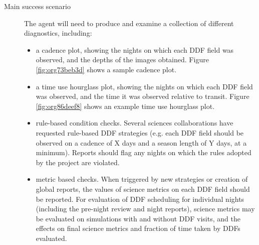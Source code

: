 \begin{description}
\item[{Main success scenario}] The agent will need to produce and examine a collection of different diagnostics, including:
\begin{itemize}
\item a cadence plot, showing the nights on which each DDF field was observed, and the depths of the images obtained. Figure \ref{fig:org73beb3d} shows a sample cadence plot.
\item a time use hourglass plot, showing the nights on which each DDF field was observed, and the time it was observed relative to transit. Figure \ref{fig:org86deef8} shows an example time use hourglass plot.
\item rule-based condition checks. Several sciences collaborations have requested rule-based DDF strategies (e.g. each DDF field should be observed on a cadence of X days and a season length of Y days, at a minimum). Reports should flag any nights on which the rules adopted by the project are violated.
\item metric based checks. When triggered by new strategies or creation of global reports, the values of science metrics on each DDF field should be reported. For evaluation of DDF scheduling for individual nights (including the pre-night review and night reports), science metrics may be evaluated on simulations with and without DDF visits, and the effects on final science metrics and fraction of time taken by DDFs evaluated.
\end{itemize}
\end{description}
